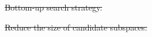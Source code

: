 \documentclass[
 size=14pt,
 paper=smartboard,  %
 mode=present, 		%
 display=slides, 	%
 style=tuliplab,  	%
 pauseslide,
 fleqn,leqno]{powerdot}
\providecommand{\DIFdeltex}[1]{{\protect\color{red}\sout{#1}}}                      %
\providecommand{\DIFdelbegin}{} %
\providecommand{\DIFdelend}{} %
\providecommand{\DIFdel}[1]{\texorpdfstring{\DIFdeltex{#1}}{}} %
\newcommand{\DIFscaledelfig}{0.5}
\newlength{\DIFdelgraphicswidth} %
\newlength{\DIFdelgraphicsheight} %
\newcommand{\DIFdelincludegraphics}[2][]{%
\sbox{\DIFdelgraphicsbox}{\DIFOincludegraphics[#1]{#2}}%
\settoboxwidth{\DIFdelgraphicswidth}{\DIFdelgraphicsbox} %
\settoboxtotalheight{\DIFdelgraphicsheight}{\DIFdelgraphicsbox} %
\scalebox{\DIFscaledelfig}{%
\parbox[b]{\DIFdelgraphicswidth}{\usebox{\DIFdelgraphicsbox}\\[-\baselineskip] \rule{\DIFdelgraphicswidth}{0em}}\llap{\resizebox{\DIFdelgraphicswidth}{\DIFdelgraphicsheight}{%
\setlength{\unitlength}{\DIFdelgraphicswidth}%
\begin{picture}(1,1)%
\thicklines\linethickness{2pt} %
{\color[rgb]{1,0,0}\put(0,0){\framebox(1,1){}}}%
{\color[rgb]{1,0,0}\put(0,0){\line( 1,1){1}}}%
{\color[rgb]{1,0,0}\put(0,1){\line(1,-1){1}}}%
\end{picture}%
}\hspace*{3pt}}} %
} %
\DeclareRobustCommand{\DIFdelbegin}{\DIFOdelbegin \let\includegraphics\DIFdelincludegraphics} %
\DeclareRobustCommand{\DIFdelend}{\DIFOaddend \let\includegraphics\DIFOincludegraphics} %
\begin{document}
\DIFdelbegin %
\DIFdel{Bottom-up search strategy.
}\DIFdelend %

\DIFdelbegin %
\DIFdel{Reduce the size of candidate subspaces.
}\DIFdelend %

\DIFdelbegin %
\DIFdelend %
\end{document}
